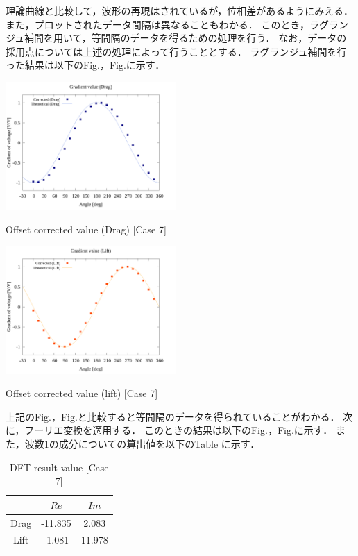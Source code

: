 理論曲線と比較して，波形の再現はされているが，位相差があるようにみえる．
また，プロットされたデータ間隔は異なることもわかる．
このとき，ラグランジュ補間を用いて，等間隔のデータを得るための処理を行う．
なお，データの採用点については上述の処理によって行うこととする．
ラグランジュ補間を行った結果は以下のFig.，Fig.に示す．

\begin{multicols}{2}
    \begin{figure_here}
        \begin{center}
        \includegraphics[width=65mm]{../../02_workspace/result/simulation_tx=10.0_ty=-5.0_dx=5.00_dy=-2.50/plot/21/21-3_interpolated_drag.png}
        \caption{Offset corrected value (Drag) [Case 7]}
        \includegraphics[width=65mm]{../../02_workspace/result/simulation_tx=10.0_ty=-5.0_dx=5.00_dy=-2.50/plot/21/21-3_interpolated_lift.png}
        \caption{Offset corrected value (lift) [Case 7]}
        \end{center}
    \end{figure_here}
\end{multicols}

上記のFig.，Fig.と比較すると等間隔のデータを得られていることがわかる．
次に，フーリエ変換を適用する．
このときの結果は以下のFig.，Fig.に示す．
また，波数1の成分についての算出値を以下のTable に示す．

\begin{table}[htbp]
    \begin{center}
        \caption{DFT result value [Case 7]}
        \begin{tabular}{|p{30mm}|p{20mm}|p{20mm}|}
            \hline
            \multicolumn{1}{|c|}{}       & \multicolumn{1}{|c|}{$Re$}   & \multicolumn{1}{|c|}{$Im$} \\ \hline
            \multicolumn{1}{|c|}{Drag} & \multicolumn{1}{|c|}{-11.835}     & \multicolumn{1}{|c|}{2.083}         \\ \hline
            \multicolumn{1}{|c|}{Lift} & \multicolumn{1}{|c|}{-1.081}     & \multicolumn{1}{|c|}{11.978}         \\ \hline
        \end{tabular}
    \end{center}
\end{table}

